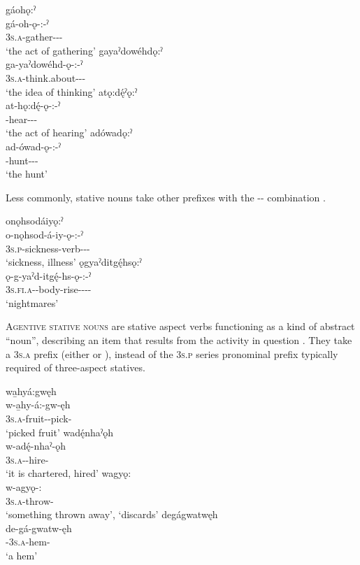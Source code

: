 \ea\label{ex:statvarex13} 
\ea gáohǫ:ˀ\\
\gll gá-oh-ǫ-:-ˀ\\
 \textsc{3s.a}-gather-{\stative}-{\length}-\exsc{\nsf}\\
\glt `the act of gathering'
\ex gayaˀdowéhdǫ:ˀ\\
\gll ga-yaˀdowéhd-ǫ-:-ˀ\\
 \textsc{3s.a}-think.about-{\stative}-{\length}-\exsc{\nsf}\\
\glt `the idea of thinking'
\ex atǫ:dę́ˀǫ:ˀ\\
\gll at-hǫ:dę́-ǫ-:-ˀ\\
 -hear-{\stative}-{\length}-\exsc{\nsf}\\
\glt `the act of hearing'
\ex adówadǫ:ˀ\\
\gll ad-ówad-ǫ-:-ˀ\\
 -hunt-{\stative}-{\length}-\exsc{\nsf}\\
\glt `the hunt'
\z
\z

Less commonly, stative nouns take other prefixes with the  {\stative}-{\length}-\exsc{\nsf} combination .

\ea\label{ex:statvarex14} 
\ea onǫhsodáiyǫ:ˀ\\
\gll o-nǫhsod-á-iy-ǫ-:-ˀ\\
 \textsc{3s.p}-sickness-verb-{\stative}-{\length}-\exsc{\nsf}\\
\glt `sickness, illness'
\ex ǫgyaˀditgę́hsǫ:ˀ\\
\gll ǫ-g-yaˀd-itgę́-hs-ǫ-:-ˀ\\
 \textsc{3s.fi.a}-{\semireflexive}-body-rise-{\distributive}-{\stative}-{\length}-\exsc{\nsf}\\
\glt `nightmares'
\z
\z

\textsc{Agentive stative nouns} are stative aspect verbs functioning as a kind of abstract “noun”, describing an item that results from the activity in question . They take a \textsc{3s.a} prefix (either  or ), instead of the  \textsc{3s.p} series pronominal prefix typically required of three-aspect statives.

\ea\label{ex:statvarex12} 
\ea wa̱hyá:gwęh\\
\gll w-a̱hy-á:-gw-ęh\\
 \textsc{3s.a}-fruit-{\joinerE}-pick-{\stative}\\
\glt `picked fruit'
\ex wadę́nhaˀǫh\\
\gll w-adę́-nhaˀ-ǫh\\
 \textsc{3s.a}-{\semireflexive}-hire-{\stative}\\
\glt `it is chartered, hired'
\ex wagyǫ: \\
\gll w-agyǫ-:\\
 \textsc{3s.a}-throw-{\stative}\\
\glt ‘something thrown away’, `discards'
\ex degágwatwęh\\
\gll de-gá-gwatw-ęh\\
 {\dualic}-\textsc{3s.a}-hem-{\stative}\\
\glt `a hem'
\z
\z




